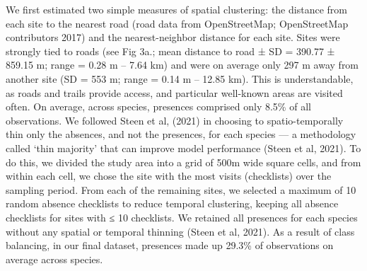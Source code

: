 We first estimated two simple measures of spatial clustering: the distance from each site to the nearest road (road data from OpenStreetMap; OpenStreetMap contributors 2017) and the nearest-neighbor distance for each site.
Sites were strongly tied to roads (see Fig 3a.; mean distance to road ± SD = 390.77 ± 859.15 m; range = 0.28 m -- 7.64 km) and were on average only 297 m away from another site (SD = 553 m; range = 0.14 m -- 12.85 km).
This is understandable, as roads and trails provide access, and particular well-known areas are visited often.
On average, across species, presences comprised only 8.5\% of all observations.
We followed Steen et al, (2021) in choosing to spatio-temporally thin only the absences, and not the presences, for each species --- a methodology called `thin majority' that can improve model performance (Steen et al, 2021).
To do this, we divided the study area into a grid of 500m wide square cells, and from within each cell, we chose the site with the most visits (checklists) over the sampling period.
From each of the remaining sites, we selected a maximum of 10 random absence checklists to reduce temporal clustering, keeping all absence checklists for sites with ≤ 10 checklists.
We retained all presences for each species without any spatial or temporal thinning (Steen et al, 2021).
As a result of class balancing, in our final dataset, presences made up 29.3\% of observations on average across species.

